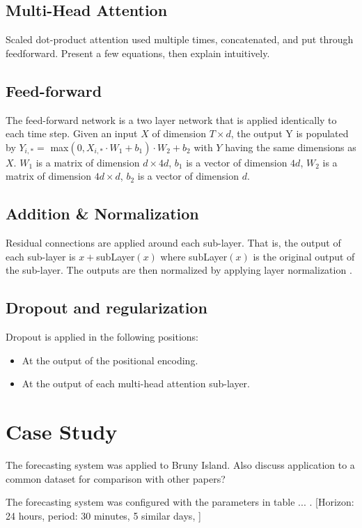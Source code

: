 \documentclass[conference]{IEEEtran}
\begin{document}
\subsection{Multi-Head Attention}
Scaled dot-product attention used multiple times, concatenated, and put through feedforward.
Present a few equations, then explain intuitively.

\subsection{Feed-forward}
The feed-forward network is a two layer network that is applied identically to each time step.
Given an input $X$ of dimension $T \times d$, the output Y is populated by $Y_{i,*} = $ max$(0, X_{i,*} \cdot W_1 + b_1) \cdot W_2 + b_2$ with $Y$ having the same dimensions as $X$.
$W_1$ is a matrix of dimension $d \times 4d$, $b_1$ is a vector of dimension $4d$, $W_2$ is a matrix of dimension $4d \times d$, $b_2$ is a vector of dimension $d$.

\subsection{Addition \& Normalization}
Residual connections \cite{He2015} are applied around each sub-layer.
That is, the output of each sub-layer is $x + $subLayer$(x)$ where subLayer$(x)$ is the original output of the sub-layer.
The outputs are then normalized by applying layer normalization \cite{Ba2016}.

\subsection{Dropout and regularization}
Dropout is applied in the following positions:
\begin{itemize}
	\item At the output of the positional encoding. 
	\item At the output of each multi-head attention sub-layer.
\end{itemize}


\section{Case Study}
The forecasting system was applied to Bruny Island.
Also discuss application to a common dataset for comparison with other papers?

The forecasting system was configured with the parameters in table ... .
[Horizon: 24 hours, period: 30 minutes, 5 similar days, ]
\end{document}
